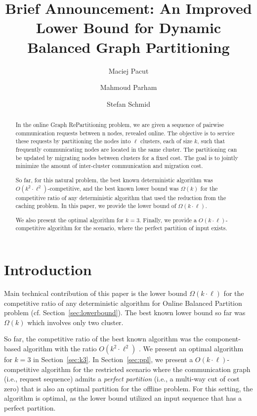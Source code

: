 \documentclass[manuscript,screen=true]{acmart}
\title{Brief Announcement: An Improved Lower Bound for Dynamic Balanced Graph Partitioning}
\author{Maciej Pacut}
\affiliation{%
  \institution{Faculty of Computer Science, University of Vienna}
  \country{Austria}
}
\author{Mahmoud Parham}
\affiliation{%
  \institution{Faculty of Computer Science, University of Vienna}
  \country{Austria}
}
\author{Stefan Schmid}
\affiliation{%
  \institution{Faculty of Computer Science, University of Vienna}
  \country{Austria}
}
\begin{document}
\begin{abstract}
  In the online Graph RePartitioning problem, we are given a sequence of pairwise communication requests between n nodes, revealed online.
  The objective is to service these requests by partitioning the nodes into $\ell$ clusters, each of size $k$, such that frequently communicating nodes are located in the same cluster.
  The partitioning can be updated by migrating nodes between clusters for a fixed cost.
  The goal is to jointly minimize the amount of inter-cluster communication and migration cost.

  So far, for this natural problem, the best known deterministic algorithm was $O(k^2\cdot \ell^2)$-competitive, and the best known lower bound was $\Omega(k)$ for the competitive ratio of any deterministic algorithm that used the reduction from the caching problem.
  In this paper, we provide the lower bound of $\Omega(k\cdot \ell)$.
  
  We also present the optimal algorithm for $k=3$.
  Finally, we provide a $O(k\cdot \ell)$-competitive algorithm for the scenario, where the perfect partition of input exists.
\end{abstract}
    
\maketitle
    
\renewcommand{\shortauthors}{M.~Pacut, M.~Parham, S.~Schmid}

\section{Introduction}

Main technical contribution of this paper is the lower bound $\Omega(k\cdot\ell)$ for the competitive ratio of any deterministic algorithm for Online Balanced Partition problem (cf. Section~\ref{sec:lowerbound}).
The best known lower bound so far was $\Omega(k)$ \cite{repartition-disc}
which involves only two cluster.


So far, the competitive ratio of the best known algorithm was the component-based algorithm with the ratio $O(k^2\cdot \ell^2)$ \cite{repartition-disc}.
We present an optimal algorithm for $k=3$ in Section~\ref{sec:k3}.
In Section~\ref{sec:ppl}, we present a $O(k\cdot \ell)$-competitive algorithm for the restricted scenario
where the communication graph (i.e., request sequence) admits a \emph{perfect partition} (i.e., a multi-way cut of cost zero) that is also an optimal partition for the offline problem.
For this setting, the algorithm is optimal, as the lower bound utilized an input sequence that has a perfect partition.
\end{document}
